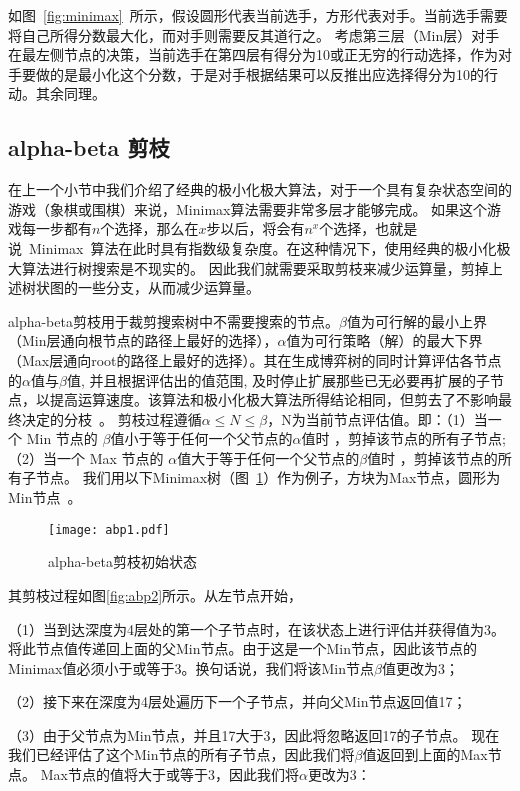 如图~\ref{fig:minimax}~所示，假设圆形代表当前选手，方形代表对手。当前选手需要将自己所得分数最大化，而对手则需要反其道行之。
考虑第三层（Min层）对手在最左侧节点的决策，当前选手在第四层有得分为10或正无穷的行动选择，作为对手要做的是最小化这个分数，于是对手根据结果可以反推出应选择得分为10的行动。其余同理。
\subsection{alpha-beta 剪枝}
在上一个小节中我们介绍了经典的极小化极大算法，对于一个具有复杂状态空间的游戏（象棋或围棋）来说，Minimax算法需要非常多层才能够完成。
如果这个游戏每一步都有$n$个选择，那么在$x$步以后，将会有$n^x$个选择，也就是说~Minimax~算法在此时具有指数级复杂度。在这种情况下，使用经典的极小化极大算法进行树搜索是不现实的。
因此我们就需要采取剪枝来减少运算量，剪掉上述树状图的一些分支，从而减少运算量。

alpha-beta剪枝用于裁剪搜索树中不需要搜索的节点。$\beta$值为可行解的最小上界（Min层通向根节点的路径上最好的选择），$\alpha$值为可行策略（解）的最大下界（Max层通向root的路径上最好的选择）。其在生成博弈树的同时计算评估各节点的$\alpha$值与$\beta$值, 并且根据评估出的值范围, 及时停止扩展那些已无必要再扩展的子节点，以提高运算速度。该算法和极小化极大算法所得结论相同，但剪去了不影响最终决定的分枝~\cite{russell2010artificial}。
剪枝过程遵循$\alpha \le N \le \beta$，N为当前节点评估值。即：（1）当一个 Min 节点的 $\beta$值小于等于任何一个父节点的$\alpha$值时 ，剪掉该节点的所有子节点;（2）当一个 Max 节点的 $\alpha$值大于等于任何一个父节点的$\beta$值时 ，剪掉该节点的所有子节点。
我们用以下Minimax树（图~\ref{fig:abp}）作为例子，方块为Max节点，圆形为Min节点~\cite{russell2010artificial}。
\begin{figure}[htb]
    \centering
    \texttt{[image: abp1.pdf]}
    \caption[abp]{%
    alpha-beta剪枝初始状态~\cite{russell2010artificial}%
      }
    \label{fig:abp}
  \end{figure}

其剪枝过程如图\ref{fig:abp2}所示。从左节点开始，

（1）当到达深度为4层处的第一个子节点时，在该状态上进行评估并获得值为3。将此节点值传递回上面的父Min节点。由于这是一个Min节点，因此该节点的Minimax值必须小于或等于3。换句话说，我们将该Min节点$\beta$值更改为3；

（2）接下来在深度为4层处遍历下一个子节点，并向父Min节点返回值17；

（3）由于父节点为Min节点，并且17大于3，因此将忽略返回17的子节点。 现在我们已经评估了这个Min节点的所有子节点，因此我们将$\beta$值返回到上面的Max节点。 Max节点的值将大于或等于3，因此我们将$\alpha$更改为3：

